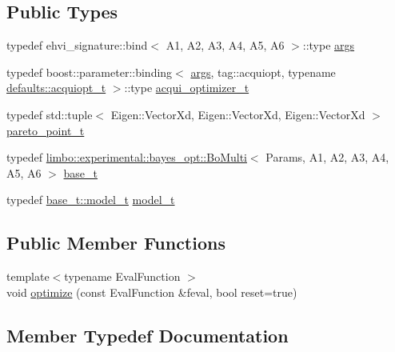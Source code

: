 \subsection*{Public Types}
\begin{DoxyCompactItemize}
\item 
typedef ehvi\+\_\+signature\+::bind$<$ A1, A2, A3, A4, A5, A6 $>$\+::type \hyperlink{classlimbo_1_1experimental_1_1bayes__opt_1_1_ehvi_ad5deb9cf89fe77464130cd2d400b5d7b}{args}
\item 
typedef boost\+::parameter\+::binding$<$ \hyperlink{classlimbo_1_1bayes__opt_1_1_bo_base_a3844c259aa1e59d0241f90390aa6f7fa}{args}, tag\+::acquiopt, typename \hyperlink{structlimbo_1_1experimental_1_1bayes__opt_1_1_ehvi_1_1defaults_a3de3f3a53d396b50e0358661f122d450}{defaults\+::acquiopt\+\_\+t} $>$\+::type \hyperlink{classlimbo_1_1experimental_1_1bayes__opt_1_1_ehvi_a73568ce8f21582499102ca29a8ccbc68}{acqui\+\_\+optimizer\+\_\+t}
\item 
typedef std\+::tuple$<$ Eigen\+::\+Vector\+Xd, Eigen\+::\+Vector\+Xd, Eigen\+::\+Vector\+Xd $>$ \hyperlink{classlimbo_1_1experimental_1_1bayes__opt_1_1_ehvi_a8e741bf553820c0f0af7b9545d2d773c}{pareto\+\_\+point\+\_\+t}
\item 
typedef \hyperlink{classlimbo_1_1experimental_1_1bayes__opt_1_1_bo_multi}{limbo\+::experimental\+::bayes\+\_\+opt\+::\+Bo\+Multi}$<$ Params, A1, A2, A3, A4, A5, A6 $>$ \hyperlink{classlimbo_1_1experimental_1_1bayes__opt_1_1_ehvi_ad0955fc65023479e48d85c50f1b2804d}{base\+\_\+t}
\item 
typedef \hyperlink{classlimbo_1_1bayes__opt_1_1_bo_base_a151af5c7eef92a82d8813bb2e067d267}{base\+\_\+t\+::model\+\_\+t} \hyperlink{classlimbo_1_1experimental_1_1bayes__opt_1_1_ehvi_af064e606073005f78ef0445d4ab4bc31}{model\+\_\+t}
\end{DoxyCompactItemize}
\subsection*{Public Member Functions}
\begin{DoxyCompactItemize}
\item 
{\footnotesize template$<$typename Eval\+Function $>$ }\\void \hyperlink{classlimbo_1_1experimental_1_1bayes__opt_1_1_ehvi_a44003c1ef6450cbcce18e5c978e30f2c}{optimize} (const Eval\+Function \&feval, bool reset=true)
\end{DoxyCompactItemize}


\subsection{Member Typedef Documentation}
\hypertarget{classlimbo_1_1experimental_1_1bayes__opt_1_1_ehvi_a73568ce8f21582499102ca29a8ccbc68}{}
